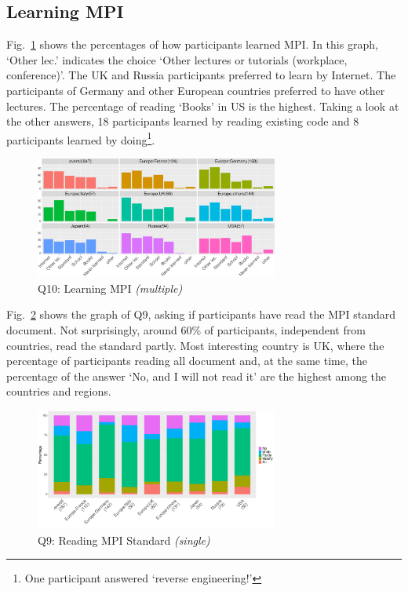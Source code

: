 \documentclass[conference,10pt,letterpaper]{IEEEtran}
\def\myquote#1{`#1'}
\begin{document}
    
\subsection{Learning MPI}\label{sec:learning-mpi}

Fig.~\ref{fig:learning-mpi} shows the percentages of how participants
learned MPI. In this graph, \myquote{Other lec.} indicates the choice
\myquote{Other lectures or tutorials (workplace, conference)}. The
UK and Russia participants preferred to learn by Internet. The
participants of Germany and other European countries preferred to have
other lectures. The percentage of reading \myquote{Books} in US is the
highest. Taking a look at the other answers, 18 participants learned
by reading existing code and 8 participants learned by
doing\footnote{One participant answered \myquote{reverse engineering!}}. 

\begin{figure}[htb]
\begin{center}
\includegraphics[width=8cm]{R-scripts/Q10.pdf}
\caption{Q10: Learning MPI {\it(multiple)}}
\label{fig:learning-mpi}
\end{center}
\end{figure}

Fig.~\ref{fig:reading-standard} shows the graph of Q9, asking if
participants have read the MPI standard document. Not surprisingly,
around 60\% of participants, independent from countries, read the
standard partly. Most interesting country is UK, where the percentage
of participants reading all document and, at the same time, the
percentage of the answer \myquote{No, and I will not read it} are the
highest among the countries and regions. 

\begin{figure}[htb]
\begin{center}
\includegraphics[width=8cm]{R-scripts/Q9.pdf}
\caption{Q9: Reading MPI Standard {\it(single)}}
\label{fig:reading-standard}
\end{center}
\end{figure}
\end{document}
